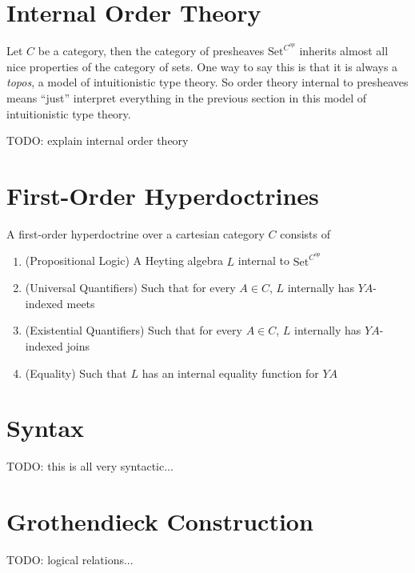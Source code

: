\documentclass{article}
\newcommand{\Set}{\textrm{Set}}
\begin{document}
\section{Internal Order Theory}

Let $C$ be a category, then the category of presheaves $\Set^{C^{op}}$
inherits almost all nice properties of the category of sets. One way
to say this is that it is always a \emph{topos}, a model of
intuitionistic type theory. So order theory internal to presheaves
means ``just'' interpret everything in the previous section in this
model of intuitionistic type theory.

TODO: explain internal order theory

\section{First-Order Hyperdoctrines}

A first-order hyperdoctrine over a cartesian category $C$ consists of
\begin{enumerate}
\item (Propositional Logic) A Heyting algebra $L$ internal to $\Set^{C^{op}}$
\item (Universal Quantifiers) Such that for every $A \in C$, $L$ internally has $YA$-indexed meets
\item (Existential Quantifiers) Such that for every $A \in C$, $L$ internally has $YA$-indexed joins
\item (Equality) Such that $L$ has an internal equality function for $YA$
\end{enumerate}

\section{Syntax}

TODO: this is all very syntactic...

\section{Grothendieck Construction}

TODO: logical relations...
\end{document}
